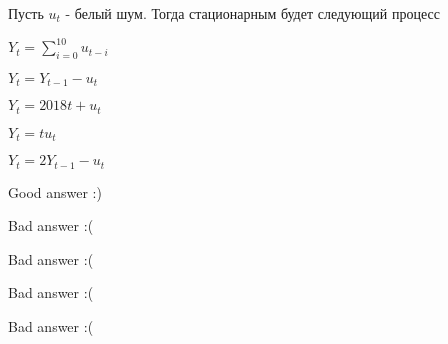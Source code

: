 
\begin{question}
Пусть \(u_t\) - белый шум. Тогда стационарным будет следующий процесс
\begin{answerlist}
  \item \(Y_t = \sum_{i = 0}^{10} u_{t-i}\)
  \item \(Y_t = Y_{t-1} - u_t\)
  \item \(Y_t = 2018t + u_t\)
  \item \(Y_t = t u_t\)
  \item \(Y_t = 2Y_{t-1} - u_t\)
\end{answerlist}
\end{question}

\begin{solution}
\begin{answerlist}
  \item Good answer :)
  \item Bad answer :(
  \item Bad answer :(
  \item Bad answer :(
  \item Bad answer :(
\end{answerlist}
\end{solution}


